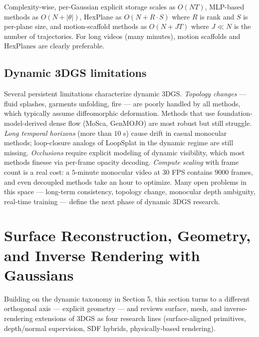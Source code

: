 \documentclass{article}
\begin{document}
Complexity-wise, per-Gaussian explicit storage scales as \(O(NT)\), MLP-based methods as \(O(N + |\theta|)\), HexPlane as \(O(N + R\cdot S)\) where \(R\) is rank and \(S\) is per-plane size, and motion-scaffold methods as \(O(N + JT)\) where \(J\ll N\) is the number of trajectories. For long videos (many minutes), motion scaffolds and HexPlanes are clearly preferable.

\subsection{Dynamic 3DGS limitations}\label{dynamic-3dgs-limitations}

Several persistent limitations characterize dynamic 3DGS. \emph{Topology changes} --- fluid splashes, garments unfolding, fire --- are poorly handled by all methods, which typically assume diffeomorphic deformation. Methods that use foundation-model-derived dense flow (MoSca, GenMOJO) are most robust but still struggle. \emph{Long temporal horizons} (more than \(10\) s) cause drift in casual monocular methods; loop-closure analogs of LoopSplat in the dynamic regime are still missing. \emph{Occlusions} require explicit modeling of dynamic visibility, which most methods finesse via per-frame opacity decoding. \emph{Compute scaling} with frame count is a real cost: a \(5\)-minute monocular video at \(30\) FPS contains \(9000\) frames, and even decoupled methods take an hour to optimize. Many open problems in this space --- long-term consistency, topology change, monocular depth ambiguity, real-time training --- define the next phase of dynamic 3DGS research.

\section{Surface Reconstruction, Geometry, and Inverse Rendering with Gaussians}\label{surface-reconstruction-geometry-and-inverse-rendering-with-gaussians}

Building on the dynamic taxonomy in Section 5, this section turns to a different orthogonal axis --- explicit geometry --- and reviews surface, mesh, and inverse-rendering extensions of 3DGS as four research lines (surface-aligned primitives, depth/normal supervision, SDF hybrids, physically-based rendering).
\end{document}
